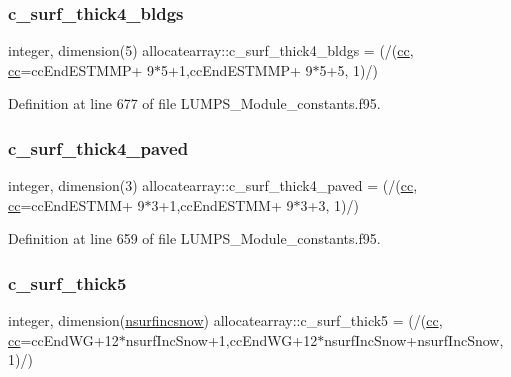 \subsubsection{\texorpdfstring{c\+\_\+surf\+\_\+thick4\+\_\+bldgs}{c\_surf\_thick4\_bldgs}}
{\footnotesize\ttfamily integer, dimension(5) allocatearray\+::c\+\_\+surf\+\_\+thick4\+\_\+bldgs = (/(\hyperlink{namespaceallocatearray_ac863c81704eb507dee10f5e10741e10c}{cc}, \hyperlink{namespaceallocatearray_ac863c81704eb507dee10f5e10741e10c}{cc}=cc\+End\+E\+S\+T\+M\+MP+ 9$\ast$5+1,cc\+End\+E\+S\+T\+M\+MP+ 9$\ast$5+5, 1)/)}



Definition at line 677 of file L\+U\+M\+P\+S\+\_\+\+Module\+\_\+constants.\+f95.

\mbox{\label{namespaceallocatearray_aa58317ae249f058a9b33be35a803a68e}} 
\subsubsection{\texorpdfstring{c\+\_\+surf\+\_\+thick4\+\_\+paved}{c\_surf\_thick4\_paved}}
{\footnotesize\ttfamily integer, dimension(3) allocatearray\+::c\+\_\+surf\+\_\+thick4\+\_\+paved = (/(\hyperlink{namespaceallocatearray_ac863c81704eb507dee10f5e10741e10c}{cc}, \hyperlink{namespaceallocatearray_ac863c81704eb507dee10f5e10741e10c}{cc}=cc\+End\+E\+S\+T\+MM+ 9$\ast$3+1,cc\+End\+E\+S\+T\+MM+ 9$\ast$3+3, 1)/)}



Definition at line 659 of file L\+U\+M\+P\+S\+\_\+\+Module\+\_\+constants.\+f95.

\mbox{\label{namespaceallocatearray_a0c826a9f4443bc7d56a37347a79fd81d}} 
\subsubsection{\texorpdfstring{c\+\_\+surf\+\_\+thick5}{c\_surf\_thick5}}
{\footnotesize\ttfamily integer, dimension(\hyperlink{namespaceallocatearray_af4d113f332b6759cfa22271140c9162d}{nsurfincsnow}) allocatearray\+::c\+\_\+surf\+\_\+thick5 = (/(\hyperlink{namespaceallocatearray_ac863c81704eb507dee10f5e10741e10c}{cc}, \hyperlink{namespaceallocatearray_ac863c81704eb507dee10f5e10741e10c}{cc}=cc\+End\+WG+12$\ast$nsurf\+Inc\+Snow+1,cc\+End\+WG+12$\ast$nsurf\+Inc\+Snow+nsurf\+Inc\+Snow, 1)/)}




